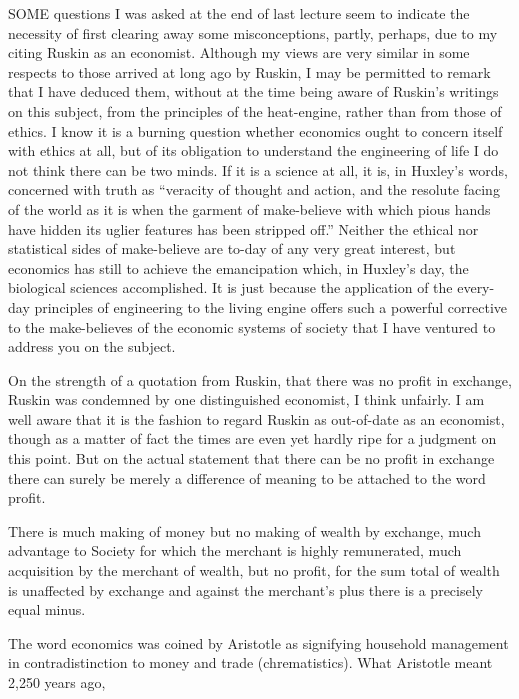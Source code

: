\documentclass[10.5pt,twoside]{book}
\newcommand{\origpage}[1]{\clearpage\setcounter{page}{#1}}
\begin{document}
\lettrine[lines=2,findent=2pt,nindent=0pt,slope=0pt]{S}{OME} questions I was
asked at the end of last lecture seem to indicate the necessity of first
clearing away some misconceptions, partly, perhaps, due to my citing Ruskin as
an economist. Although my views are very similar in some respects to those
arrived at long ago by Ruskin, I may be permitted to remark that I have
deduced them, without at the time being aware of Ruskin's writings on this
subject, from the principles of the heat-engine, rather than from those of
ethics. I know it is a burning question whether economics ought to concern
itself with ethics at all, but of its obligation to understand the engineering
of life I do not think there can be two minds. If it is a science at all, it
is, in Huxley's words, concerned with truth as ``veracity of thought and
action, and the resolute facing of the world as it is when the garment of
make-believe with which pious hands have hidden its uglier features has been
stripped off.'' Neither the ethical nor statistical sides of make-believe are
to-day of any very great interest, but economics has still to achieve the
emancipation which, in Huxley's day, the biological sciences accomplished. It
is just because the application of the every-day principles of engineering to
the living engine offers such a powerful corrective to the make-believes of
the economic systems of society that I have ventured to address you on the
subject.

On the strength of a quotation from Ruskin, that there was no profit in
exchange, Ruskin was condemned by one distinguished economist, I think
unfairly. I am well aware that it is the fashion to regard Ruskin as
out-of-date as an economist, though as a matter of fact the times are even yet
hardly ripe for a judgment on this point. But on the actual statement that
there can be no profit in exchange there can surely be merely a difference of
meaning to be attached to the word profit.

There is much making of money but no making of wealth by exchange, much
advantage to Society for which the merchant is highly remunerated, much
acquisition by the merchant of wealth, but no profit, for the sum total of
wealth is unaffected by exchange and against the merchant's plus there is a
precisely equal minus.

The word economics was coined by Aristotle as signifying household management
in contradistinction to money and trade (chrematistics). What Aristotle meant
2,250 years ago,

\origpage{21}
\end{document}
